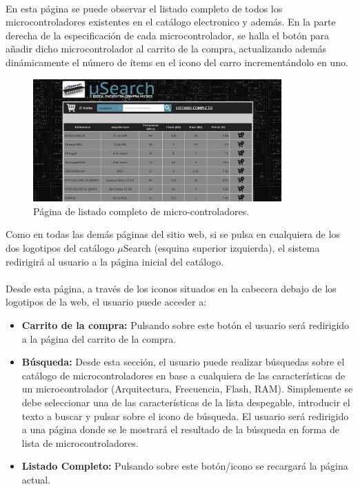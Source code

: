\paragraph{}En esta página se puede observar el listado completo de todos los microcontroladores existentes en el catálogo electronico y además. En la parte derecha de la especificación de cada microcontrolador, se halla el botón para añadir dicho microcontrolador al carrito de la compra, actualizando además dinámicamente el número de ítems en el icono del carro incrementándolo en uno.

\begin{figure}[h!]
	\centering
	\includegraphics[width=0.85\textwidth]{img/listado_completo_user}
	\caption{Página de listado completo de micro-controladores.}
	\label{fig:listado_completo_user}
\end{figure}

Como en todas las demás páginas del sitio web, si se pulsa en cualquiera de los dos logotipos del catálogo $\mu$Search (esquina superior izquierda), el sistema redirigirá al usuario a la página inicial del catálogo.

\paragraph{}Desde esta página, a través de los iconos situados en la cabecera debajo de los logotipos de la web, el usuario puede acceder a:

\begin{itemize}
	\item\textbf{Carrito de la compra:} Pulsando sobre este botón el usuario será redirigido a la página del carrito de la compra.
		
	\item \textbf{Búsqueda:} Desde esta sección, el usuario puede realizar búsquedas sobre el catálogo de microcontroladores en base a cualquiera de las características de un microcontrolador (Arquitectura, Frecuencia, Flash, RAM). Simplemente se debe seleccionar una de las características de la lista despegable, introducir el texto a buscar y pulsar sobre el icono de búsqueda.
	El usuario será redirigido a una página donde se le mostrará el resultado de la búsqueda en forma de lista de microcontroladores.
		
	\item \textbf{Listado Completo:} Pulsando sobre este botón/icono se recargará la página actual.
\end{itemize}